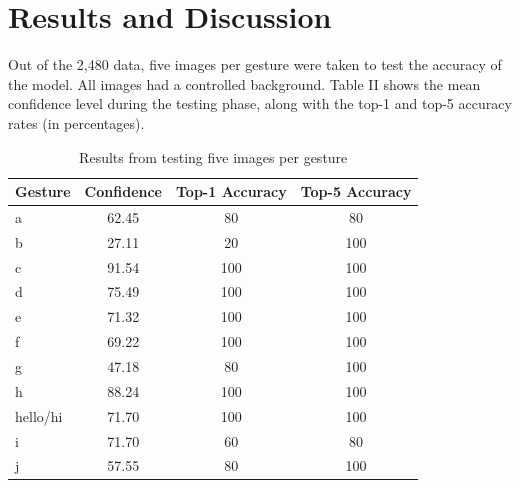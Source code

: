 \documentclass[journal]{./IEEE/IEEEtran}
\begin{document}
\section{Results and Discussion}

Out of the 2,480 data, five images per gesture were taken to test the accuracy of the model. All images had a controlled background. Table II shows the mean confidence level during the testing phase, along with the top-1 and top-5 accuracy rates (in percentages).

\begin{table}[ht!]
\centering
\caption{Results from testing five images per gesture}
\begin{tabular}{|l|c|c|c|}
\hline
\multicolumn{1}{|c|}{\textbf{Gesture}} & \textbf{Confidence} & \textbf{Top-1 Accuracy} & \textbf{Top-5 Accuracy} \\ \hline
a                                      & 62.45                   & 80                      & 80                      \\ \hline
b                                      & 27.11                   & 20                      & 100                     \\ \hline
c                                      & 91.54                   & 100                     & 100                     \\ \hline
d                                      & 75.49                   & 100                     & 100                     \\ \hline
e                                      & 71.32                   & 100                     & 100                     \\ \hline
f                                      & 69.22                   & 100                     & 100                     \\ \hline
g                                      & 47.18                   & 80                      & 100                     \\ \hline
h                                      & 88.24                   & 100                     & 100                     \\ \hline
hello/hi                             & 71.70                   & 100                     & 100                     \\ \hline
i                                      & 71.70                   & 60                      & 80                      \\ \hline
j                                      & 57.55                   & 80                      & 100                     \\ \hline

\end{tabular}
\end{table}
\end{document}
